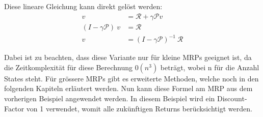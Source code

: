 Diese lineare Gleichung kann direkt gelöst werden:
\begin{align}
 v&=\mathcal{R}+\gamma\mathcal{P}v \nonumber\\
\left(I-\gamma\mathcal{P}\right)\ v&=\mathcal{R} \nonumber\\
v&=\left(I-\gamma\mathcal{P}\right)^{-1}\ \mathcal{R} \label{solve-lin-equa}
\end{align}



Dabei ist zu beachten, dass diese Variante nur für kleine MRPs geeignet ist, da die Zeitkomplexität für diese Berechnung $0(n^3)$ beträgt, wobei n für die Anzahl States steht. Für grössere MRPs gibt es erweiterte Methoden, welche noch in den folgenden Kapiteln erläutert werden. Nun kann diese Formel am MRP aus dem vorherigen Beispiel angewendet werden. In diesem Beispiel wird ein Discount-Factor von 1 verwendet, womit alle zukünftigen Returns berücksichtigt werden.

